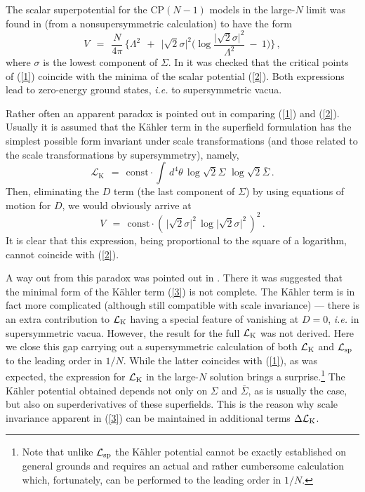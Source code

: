 \documentclass[epsfig,12pt]{article}
\def\beq{\begin{equation}}
\def\eeq{\end{equation}}
\begin{document}
	The scalar superpotential for the CP$(N-1)$ models in the large-$N$ limit was  found in \cite{SYhet,BSYhet} 
	(from a nonsupersymmetric calculation) to have the form
\beq
	V    ~~=~~    \frac{N}{4\pi}\,\bigg\{\Lambda^2 ~~+~~ 
			\big|\sqrt{2}\sigma\big|^2\Big(\log \frac{\big|\sqrt{2}\sigma\big|^2}{\Lambda^2}
					~-~ 1\Big)\bigg\}\,,
\label{2}
\eeq
	where $\sigma$ is the lowest component of $\Sigma$. In \cite{BSYhet} it was checked that the critical points of (\ref{1})
	coincide with the minima of the scalar potential (\ref{2}). Both expressions lead to zero-energy ground states, 
	{\it i.e.}  to supersymmetric vacua.

	Rather often an apparent paradox is pointed out in comparing (\ref{1}) and (\ref{2}). 
	Usually it is assumed that the K\"ahler term in the superfield formulation has the simplest possible form 
	invariant under scale transformations (and those related to the scale transformations by supersymmetry), namely,
\beq
	{\mathcal L}_\text{K}    ~~=~~    \text{const} \cdot  
				\int\, d^4 \theta\, \log \!\sqrt{2}\Sigma\,\,  \log\! \sqrt{2}\bar\Sigma\,.
\label{3}
\eeq
	Then, eliminating the $D$ term (the last component of $\Sigma$) by using equations of motion for $D$,
	we would obviously arrive at
\beq
	V    ~~=~~    \text{const} \cdot \left(\, \big|\sqrt{2}\sigma\big|^2\, \log \big|\sqrt{2}\sigma\big|^2 \,\right)^2\,.
\eeq
	It is clear that this expression, being proportional to the square of a logarithm, cannot coincide
	with (\ref{2}). 

	A way out from this paradox was pointed out in  \cite{BSYhet}. 
	There it was suggested that the minimal  form of the 
	K\"ahler term (\ref{3}) is not complete. 
	The K\"ahler term is in fact more complicated (although still compatible with scale invariance) ---  
	there is an extra contribution to ${\mathcal L}_{\rm K}$ having a special feature of vanishing at $D=0$, 
	{\it i.e.} in supersymmetric vacua. 
	However, the result for the full ${\mathcal L}_{\rm K}$ was not derived.
	Here we close this gap carrying out a supersymmetric calculation of both ${\mathcal L}_{\rm K}$ and 
	${\mathcal L}_{\rm sp}$ to the leading order in $1/N$. 
	While the latter coincides with (\ref{1}), as was expected,
	the expression for ${\mathcal L}_{\rm K}$ in the large-$N$ solution brings a surprise.\footnote{
	Note that unlike ${\mathcal L}_{\rm sp}$
	the K\"ahler potential cannot be exactly established on general grounds and requires an actual 
	and rather cumbersome calculation which, fortunately, can be performed to the  leading order in $1/N$.
	} The K\"ahler potential obtained depends not only on $\Sigma$ and $\overline\Sigma$, as is usually the case,  
	but also on superderivatives of these superfields.  
	This is the reason why scale invariance apparent in (\ref{3}) can be maintained in additional terms $\Delta {\mathcal L}_{\rm K}$.
\end{document}
